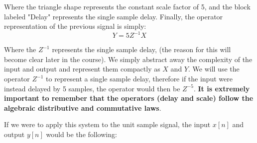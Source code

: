 \documentclass[a4paper]{article}
\numberwithin{equation}{section}
\begin{document}
Where the triangle shape represents the constant scale factor of 5, and the block labeled "Delay" represents the single sample delay. Finally, the operator representation of the previous signal is simply:
\begin{equation}
Y=5Z^{-1}X
\end{equation}

Where the $Z^{-1}$ represents the single sample delay, (the reason for this will become clear later in the course). We simply abstract away the complexity of the input and output and represent them compactly as $X$ and $Y$. We will use the operator $Z^{-1}$ to represent a single sample delay, therefore if the input were instead delayed by 5 samples, the operator would then be $Z^{-5}$. \textbf{It is extremely important to remember that the operators (delay and scale) follow the algebraic distributive and commutative laws}.

If we were to apply this system to the unit sample signal, the input $x[n]$ and output $y[n]$ would be the following:
\end{document}
